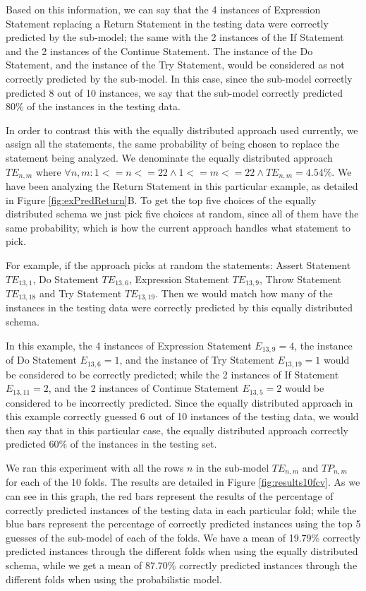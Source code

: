 \documentclass[conference]{IEEEtran}
\begin{document}
Based on this information, we can say that the 4 instances of Expression 
Statement replacing a Return Statement in the testing data were correctly 
predicted by the sub-model; the same with the 2 instances of the If Statement 
and the 2 instances of the Continue Statement. The instance of the Do Statement, 
and the instance of the Try Statement, would be considered as not correctly 
predicted by the sub-model. In this case, since the sub-model correctly 
predicted 8 out of 10 instances, we say that the sub-model correctly predicted 
80\% of the instances in the testing data. 

In order to contrast this with the equally distributed approach used currently, 
we assign all the statements, the same probability of being chosen to replace 
the statement being analyzed. We denominate the equally distributed approach 
$TE_{n,m}$ where $\forall n,m: 1<=n<=22 \land 1<=m<=22 \land TE_{n,m} = 4.54\%$. 
We have been analyzing the Return Statement in this particular example, as 
detailed in Figure \ref{fig:exPredReturn}B. To get the top five choices of the 
equally distributed schema we just pick five choices at random, since all of 
them have the same probability, which is how the current approach handles what 
statement to pick.

For example, if the approach picks at random the statements: Assert Statement 
$TE_{13,1}$, 
Do Statement $TE_{13,6}$, Expression Statement $TE_{13,9}$, Throw Statement 
$TE_{13,18}$ and Try Statement $TE_{13,19}$. Then we 
would match how many of the instances in the testing data were correctly 
predicted by this equally distributed schema.

In this example, the 4 instances of Expression Statement $E_{13,9} = 4$, the 
instance of Do 
Statement  $E_{13,6} = 1$, and the instance of Try Statement $E_{13,19} = 1$ 
would be considered to be correctly 
predicted; while the 2 instances of If Statement $E_{13,11} = 2$, and the 2 
instances of 
Continue Statement $E_{13,5} = 2$ would be considered to be incorrectly 
predicted. Since the 
equally distributed approach in this example correctly guessed 6 out of 10 
instances of the testing data, we would then say that in this particular case, 
the equally distributed approach correctly predicted 60\% of the instances in 
the testing set.  

We ran this experiment with all the rows $n$ in the sub-model $TE_{n,m}$ and 
$TP_{n,m}$ for each of the 10 
folds. The results are detailed in Figure \ref{fig:results10fcv}. As we can see 
in this graph, the red bars represent the results of the percentage of correctly 
predicted instances of the testing data in each particular fold; while the blue 
bars represent the percentage of correctly predicted instances using the top 5 
guesses of the sub-model of each of the folds. We have a mean of 19.79\% 
correctly predicted instances through the different folds when using the equally 
distributed schema, while we get a mean of 87.70\% correctly predicted instances 
through the different folds when using the probabilistic model. 
\end{document}
